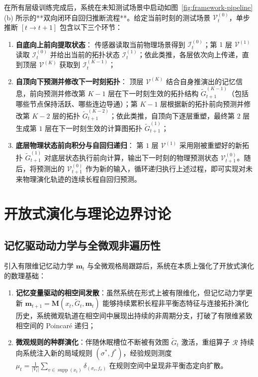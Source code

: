 \documentclass[11pt,a4paper]{article}
\numberwithin{equation}{section}
\theoremstyle{definition}
\theoremstyle{remark}
\DeclareMathOperator{\supp}{\mathrm{supp}} %
\begin{document}
	在所有层级训练完成后，系统在未知测试场景中启动如图~\ref{fig:framework-pipeline}(b) 所示的**双向闭环自回归推断流程**。给定当前时刻的测试场景 $\mathcal{V}^{(0)}_t$，单步推断 $[t \to t+1]$ 包含以下三个环节：
	\begin{enumerate}[label=(\arabic*), leftmargin=2.4em]
		\item \textbf{自底向上前向提取状态}：
		传感器读取当前物理场景得到 $\mathcal{I}_t^{(0)}$；第 $1$ 层 $\mathcal{V}^{(1)}$ 读取 $\mathcal{I}_t^{(0)}$ 并给出当前的拓扑状态 $\mathcal{I}_t^{(1)}$；依此类推，各层依次向上传递，直到顶层 $\mathcal{V}^{(K)}$ 获取到 $\mathcal{I}_t^{(K-1)}$；
		\item \textbf{自顶向下预测并修改下一时刻拓扑}：
		顶层 $\mathcal{V}^{(K)}$ 结合自身推演出的记忆信息，前向预测并修改第 $K-1$ 层在下一时刻生效的拓扑结构 $\widetilde{G}_{t+1}^{(K-1)}$（包括哪些节点保持活跃、哪些连边导通）；第 $K-1$ 层根据新的拓扑前向预测并修改第 $K-2$ 层的拓扑 $\widetilde{G}_{t+1}^{(K-2)}$；依此类推，自顶向下逐层重塑，最终第 $2$ 层生成第 $1$ 层在下一时刻生效的计算图拓扑 $\widetilde{G}_{t+1}^{(1)}$；
		\item \textbf{底层物理状态前向积分与自回归递归}：
		第 $1$ 层 $\mathcal{V}^{(1)}$ 采用刚被重塑好的新拓扑 $\widetilde{G}_{t+1}^{(1)}$ 对底层状态执行前向计算，输出下一时刻的物理预测状态 $\mathcal{V}_{t+1}^{(0)}$。随后，将预测出的 $\mathcal{V}_{t+1}^{(0)}$ 作为新的输入，循环递归执行上述过程，即可实现对未来物理演化轨迹的连续长程自回归预测。
	\end{enumerate}
	
	\section{开放式演化与理论边界讨论}\label{sec:open}
	
	\subsection{记忆驱动动力学与全微观非遍历性}
	
	引入有限维记忆动力学 $\mathbf{m}_t$ 与全微观格局跟踪后，系统在本质上强化了开放式演化的数理基础：
	\begin{enumerate}[label=(\arabic*), leftmargin=2.4em]
		\item \textbf{记忆变量驱动的相空间发散}：虽然系统在形式上被有限维化，但记忆动力学更新 $\mathbf{m}_{t+1} = \mathbf{M}(x_t, \widetilde{G}_t, \mathbf{m}_t)$ 能够持续累积长程非平衡态特征与连接拓扑演化历史，系统微观轨道在相空间中展现出持续的非周期分支，打破了有限维紧致相空间的 Poincaré 递归；
		\item \textbf{微观规则的种群演化}：伴随休眠槽位不断被有效图 $\widetilde{G}_t$ 激活，重组算子 $\mathcal{R}$ 持续向系统注入新的局域规则 $(\sigma^\ast, f^\ast)$，经验规则测度 $\mu_t = \frac{1}{|V_t|}\sum_{v\in\supp(x_t)}\delta_{(\sigma_v, f_v)}$ 在规则空间中呈现非平衡态定向扩散。
	\end{enumerate}
	
\end{document}
